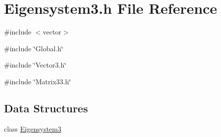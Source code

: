 \section{Eigensystem3.h File Reference}
\label{Eigensystem3_8h}
{\ttfamily \#include $<$vector$>$}\par
{\ttfamily \#include \char`\"{}Global.h\char`\"{}}\par
{\ttfamily \#include \char`\"{}Vector3.h\char`\"{}}\par
{\ttfamily \#include \char`\"{}Matrix33.h\char`\"{}}\par
\subsection*{Data Structures}
\begin{DoxyCompactItemize}
\item 
class \hyperlink{classEigensystem3}{Eigensystem3}
\end{DoxyCompactItemize}
